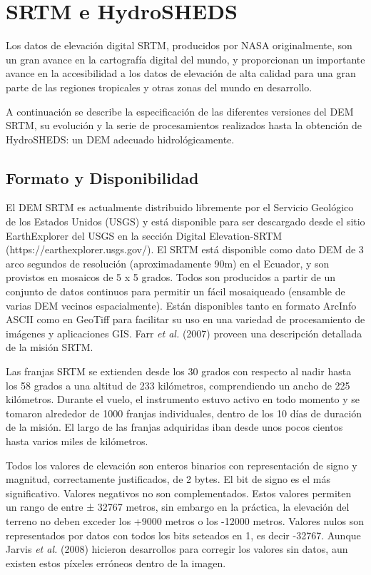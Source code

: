 \documentclass[10pt,a4paper, twoside]{report}
\begin{document}
\section{SRTM e HydroSHEDS}
\label{SRTMeHydroSHEDS}

Los datos de elevación digital SRTM, producidos por NASA originalmente, son un gran avance en la cartografía digital del mundo, y proporcionan un importante avance en la accesibilidad a los datos de elevación de alta calidad para una gran parte de las regiones tropicales y otras zonas del mundo en desarrollo.

A continuación se describe la especificación de las diferentes versiones del DEM SRTM, su evolución y la serie de procesamientos realizados hasta la obtención de HydroSHEDS: un DEM adecuado hidrológicamente.



\subsection{Formato y Disponibilidad}

El DEM SRTM es actualmente distribuido libremente por el Servicio Geológico de los Estados Unidos (USGS) y está disponible para ser descargado desde el sitio EarthExplorer del USGS en la sección Digital Elevation-SRTM (https://earthexplorer.usgs.gov/). El SRTM está disponible como dato DEM de 3 arco segundos de resolución (aproximadamente 90m) en el Ecuador, y son provistos en mosaicos de 5 x 5 grados. Todos son producidos a partir de un conjunto de datos continuos para permitir un fácil mosaiqueado (ensamble de varias DEM vecinos espacialmente). Están disponibles tanto en formato ArcInfo ASCII como en GeoTiff para facilitar su uso en una variedad de procesamiento de imágenes y aplicaciones GIS. Farr \textit{et al.} (2007) proveen una descripción detallada de la misión SRTM.

Las franjas SRTM se extienden desde los 30 grados con respecto al nadir hasta los 58 grados a una altitud de 233 kilómetros, comprendiendo un ancho de 225 kilómetros. Durante el vuelo, el instrumento estuvo activo en todo momento y se tomaron alrededor de 1000 franjas individuales, dentro de los 10 días de duración de la misión. El largo de las franjas adquiridas iban desde unos pocos cientos hasta varios miles de kilómetros.

Todos los valores de elevación son enteros binarios con representación de signo y magnitud, correctamente justificados, de 2 bytes. El bit de signo es el más significativo. Valores negativos no son complementados. Estos valores permiten un rango de entre ± 32767 metros, sin embargo en la práctica, la elevación del terreno no deben exceder los +9000 metros o los -12000 metros. Valores nulos son representados por datos con todos los bits seteados en 1, es decir -32767. Aunque Jarvis \textit{et al.} (2008) hicieron desarrollos para corregir los valores sin datos, aun existen estos píxeles erróneos dentro de la imagen.
\end{document}
